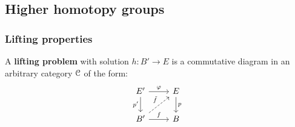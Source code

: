         \subsection{Higher homotopy groups}
            \subsubsection{Lifting properties}
                \begin{definition} \label{def: lifting_problems}
                    A \textbf{lifting problem} with solution $h: B' \to E$ is a commutative diagram in an arbitrary category $\mathcal{C}$ of the form:
                        $$
                            \begin{tikzcd}
                            	{E'} & E \\
                            	{B'} & B
                            	\arrow["{p'}"', from=1-1, to=2-1]
                            	\arrow["f", from=2-1, to=2-2]
                            	\arrow["p", from=1-2, to=2-2]
                            	\arrow["\varphi", from=1-1, to=1-2]
                            	\arrow["{\tilde{f}}", dashed, from=2-1, to=1-2]
                            \end{tikzcd}
                        $$
                \end{definition}
